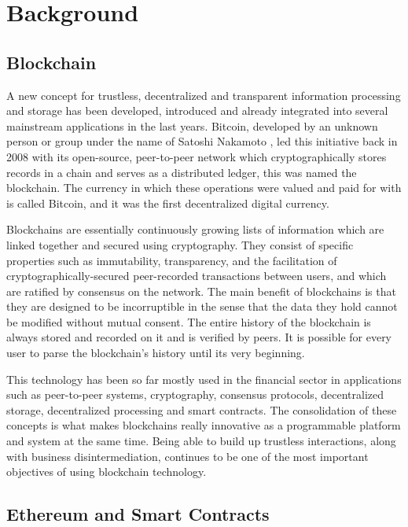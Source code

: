 \chapter{Background}
\section{Blockchain}

A new concept for trustless, decentralized and transparent information processing and storage has been developed, introduced and already integrated into several mainstream applications in the last years. Bitcoin, developed by an unknown person or group under the name of Satoshi Nakamoto \cite{nakamoto2008bitcoin}, led this initiative back in 2008 with its open-source, peer-to-peer network which cryptographically stores records in a chain and serves as a distributed ledger, this was named the blockchain. The currency in which these operations were valued and paid for with is called Bitcoin, and it was the first decentralized digital currency.

Blockchains are essentially continuously growing lists of information which are linked together and secured using cryptography. They consist of specific properties such as immutability, transparency, and the facilitation of cryptographically-secured peer-recorded transactions between users, and which are ratified by consensus on the network.
The main benefit of blockchains is that they are designed to be incorruptible in the sense that the data they hold cannot be modified without mutual consent. The entire history of the blockchain is always stored and recorded on it and is verified by peers. It is possible for every user to parse the blockchain's history until its very beginning.

This technology has been so far mostly used in the financial sector in applications such as peer-to-peer systems, cryptography, consensus protocols, decentralized storage, decentralized processing and smart contracts. The consolidation of these concepts is what makes blockchains really innovative as a programmable platform and system at the same time.
Being able to build up trustless interactions, along with business disintermediation, continues to be one of the most important objectives of using blockchain technology.

\section{Ethereum and Smart Contracts}

